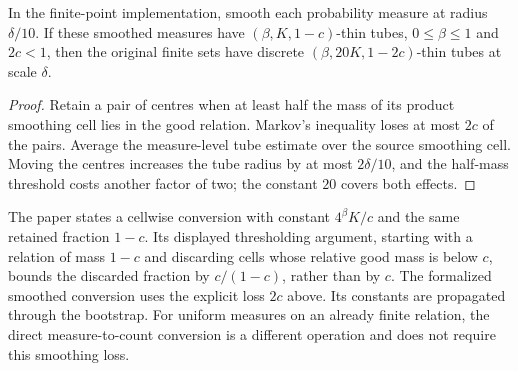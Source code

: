 \begin{lemma}
\label{lem:unsmooth-thin-tubes}
In the finite-point implementation, smooth each probability measure
at radius $\delta/10$. If these smoothed measures have
$(\beta,K,1-c)$-thin tubes, $0\leq\beta\leq1$ and $2c<1$,
then the original finite sets have discrete
$(\beta,20K,1-2c)$-thin tubes at scale $\delta$.
\end{lemma}
\begin{proof}
Retain a pair of centres when at least half the mass of its product
smoothing cell lies in the good relation. Markov's inequality loses
at most $2c$ of the pairs. Average the measure-level tube estimate
over the source smoothing cell. Moving the centres increases the
tube radius by at most $2\delta/10$, and the half-mass threshold
costs another factor of two; the constant $20$ covers both effects.
\end{proof}

\begin{remark}
\label{rem:thin-tube-loss}
The paper states a cellwise conversion with constant $4^\beta K/c$
and the same retained fraction $1-c$. Its displayed thresholding
argument, starting with a relation of mass $1-c$ and discarding cells
whose relative good mass is below $c$, bounds the discarded fraction
by $c/(1-c)$, rather than by $c$. The formalized smoothed conversion
uses the explicit loss $2c$ above. Its constants are propagated through
the bootstrap. For uniform measures on an already finite relation,
the direct measure-to-count conversion is a different operation and
does not require this smoothing loss.
\end{remark}

